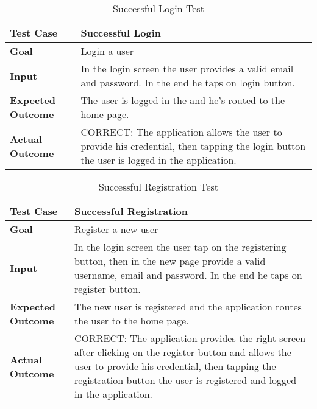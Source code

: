 \begin{table}[H]
	\centering
	\begin{tabular}{|l|l|}
	\hline
	\textbf{Test Case}& Successful Login\\
	\hline
	\textbf{Goal}& Login a user\\
	\hline
	\textbf{Input}& 
	\begin{minipage}{.7\linewidth}
	In the login screen the user provides a valid email and password. In the end he taps on login button.
	\end{minipage}\\
	\hline
	\textbf{Expected Outcome}& The user is logged in the and he's routed to the home page.\\
	\hline
	\textbf{Actual Outcome}& 
	\begin{minipage}{.7\linewidth}
	CORRECT: The application allows the user to provide his credential, then tapping the login button the user is logged in the application.
	\end{minipage}\\
	\hline	
	\end{tabular}
	\caption{Successful Login Test}
\end{table}

\begin{table}[H]
	\centering
	\begin{tabular}{|l|l|}
	\hline
	\textbf{Test Case}& Successful Registration\\
	\hline
	\textbf{Goal}& Register a new user\\
	\hline
	\textbf{Input}& 
	\begin{minipage}{.7\linewidth}
	In the login screen the user tap on the registering button, then in the new page provide a valid username, email and password. In the end he taps on register button.
	\end{minipage}\\
	\hline
	\textbf{Expected Outcome}& 
	\begin{minipage}{.7\linewidth}
	The new user is registered and the application routes the user to the home page.
	\end{minipage}\\
	\hline
	\textbf{Actual Outcome}& 
	\begin{minipage}{.7\linewidth}
	CORRECT: The application provides the right screen after clicking on the register button and allows the user to provide his credential, then tapping the registration button the user is registered and logged in the application.
	\end{minipage}\\
	\hline	
	\end{tabular}
	\caption{Successful Registration Test}
\end{table}

